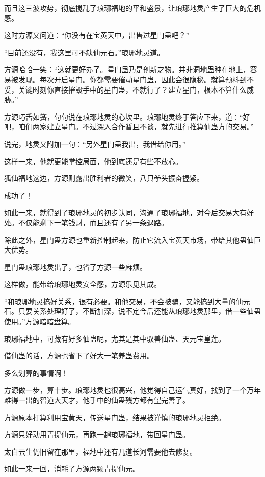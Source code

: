 \begin{this_body}
而且这三波攻势，彻底搅乱了琅琊福地的平和盛景，让琅琊地灵产生了巨大的危机感。

这时方源又问道：“你没有在宝黄天中，出售过星门蛊吧？”

“目前还没有，我这里可不缺仙元石。”琅琊地灵道。

方源哈哈一笑：“这就更好办了。星门蛊乃是创新之物。并非洞地蛊种在地上，容易被发现。每次开启星门。你都需要催动星门蛊，因此会很隐秘。就算预料到不妥，关键时刻你直接摧毁手中的星门蛊，不就行了？建立星门，根本不算什么威胁。”

方源巧舌如簧，句句说在琅琊地灵的心坎里。琅琊地灵终于答应下来，道：“好吧，咱们两家建立星门。不过深入合作暂且不谈，就先进行推算仙蛊方的交易。”

说完，地灵又附加一句：“另外星门蛊我出，我借给你用。”

这样一来，他就更能掌控局面，他到底还是有些不放心。

狐仙福地这边，方源则露出胜利者的微笑，八只拳头振奋握紧。

成功了！

如此一来，就得到了琅琊地灵的初步认同，沟通了琅琊福地，对今后交易大有好处。不仅能剩下一笔钱财，而且还有了另一条退路。

除此之外，星门蛊方源也重新控制起来，防止它流入宝黄天市场，带给其他蛊仙巨大优势。

星门蛊琅琊地灵出了，也省了方源一些麻烦。

这样做，能带给琅琊地灵安全感，方源乐见其成。

“和琅琊地灵搞好关系，很有必要。和他交易，不会被骗，又能搞到大量的仙元石。只要关系处理好了，不断加深，说不定今后还能从琅琊地灵那里，借一些仙蛊使用。”方源暗暗盘算。

琅琊福地中，可藏有好多仙蛊呢，尤其是其中驭兽仙蛊、天元宝皇莲。

借仙蛊的话，方源也省下了好大一笔养蛊费用。

多么划算的事情啊！

方源做一步，算十步。琅琊地灵也很高兴，他觉得自己运气真好，找到了一个万年难得一出的智道大天才，他手中的仙蛊残方都有望完善了。

方源原本打算利用宝黄天，传送星门蛊，结果被谨慎的琅琊地灵拒绝。

方源只好动用青提仙元，再跑一趟琅琊福地，带回星门蛊。

太白云生仍旧留在那里，福地中还有几道长河需要他去修复。

如此一来一回，消耗了方源两颗青提仙元。


\end{this_body}
